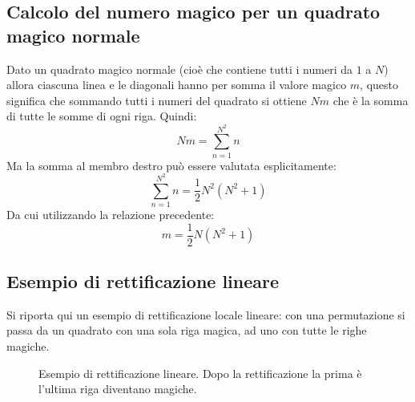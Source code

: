\documentclass[italian,twoside,twocolumn]{article}
\begin{document}
\subsection{Calcolo del numero magico per un quadrato magico normale}
Dato un quadrato magico normale (cioè che contiene tutti i numeri da $ 1 $ a $ N $) allora ciascuna linea e le diagonali hanno per somma il valore magico $ \mathit{m} $, questo significa che sommando tutti i numeri del quadrato si ottiene $  N \mathit{m} $ che è la somma di tutte le somme di ogni riga. Quindi:
\[  N \mathit{m} = \sum_{n = 1}^{N^2}n		\]
Ma la somma al membro destro può essere valutata esplicitamente:
\[	\sum_{n = 1}^{N^2}n = \frac{1}{2} N^2 (N^2 + 1)	\]
Da cui utilizzando la relazione precedente:
\[	 \mathit{m} = \frac{1}{2} N (N^2 + 1)	\]

\subsection{Esempio di rettificazione lineare}
Si riporta qui un esempio di rettificazione locale lineare: con una permutazione si passa da un quadrato con una sola riga magica, ad uno con tutte le righe magiche.
\begin{figure}[htbp]
	\centering
	\caption{Esempio di rettificazione lineare. Dopo la rettificazione la prima è l'ultima riga diventano magiche.}
	
\end{figure}
\end{document}
